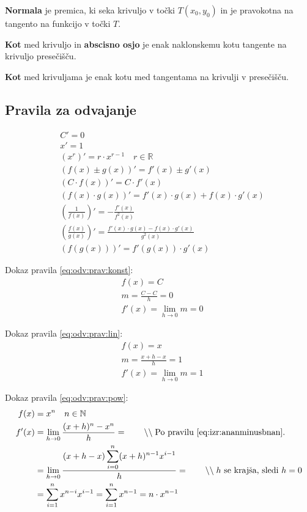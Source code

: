 \documentclass[a4paper,oneside,12pt,fleqn]{article}
\def\R{\ensuremath{\mathbb R}}
\def\N{\ensuremath{\mathbb N}}
\newcommand\krat\cdot
\newcommand{\comment}[1]{\ensuremath{\qquad\backslash\backslash\;}\textnormal{#1}}
\def\limh{\lim_{h\rightarrow0}} %
\numberwithin{equation}{section}
\begin{document}
\textbf{Normala} je premica, ki seka krivuljo v točki $T(x_0, y_0)$ in je pravokotna na tangento na
funkcijo v točki $T$.

\textbf{Kot} med krivuljo in \textbf{abscisno osjo} je enak naklonskemu kotu tangente na krivuljo
presečišču.

\textbf{Kot} med krivuljama je enak kotu med tangentama na krivulji v presečišču.

\subsection{Pravila za odvajanje}
\label{sec:odvod:prav}

\begin{align}
  & C' = 0 \label{eq:odv:prav:konst} \\
  & x' = 1 \label{eq:odv:prav:lin} \\
  & \left( x^r \right)' = r\krat x^{r-1} \quad r \in \R \label{eq:odv:prav:pow} \\
  & (f(x) \pm g(x))' = f'(x) \pm g'(x) \label{eq:odv:prav:sum} \\
  & (C\krat f(x))' = C\krat f'(x) \label{eq:odv:prav:konstkrat} \\
  & (f(x)\krat g(x))' = f'(x)\krat g(x) + f(x)\krat g'(x) \label{eq:odv:prav:krat} \\
  & \left(\frac{1}{f(x)}\right)' = - \frac{f'(x)}{f^2(x)} \label{eq:odv:prav:enaz} \\
  & \left( \frac{f(x)}{g(x)} \right)' = \frac{f'(x)\krat g(x) - f(x)\krat g'(x)}{g^2(x)} \label{eq:odv:prav:del} \\
  & \left( f(g(x)) \right)' = f'(g(x))\krat g'(x) \label{eq:odv:prav:komp}
\end{align}

Dokaz pravila \eqref{eq:odv:prav:konst}:
\begin{align*}
  & f(x) = C \\
  & m = \frac{C - C}{h} = 0 \\
  & f'(x) = \limh  m = 0
\end{align*}

Dokaz pravila \eqref{eq:odv:prav:lin}:
\begin{align*}
  & f(x) = x \\
  & m = \frac{x+h-x}{h} = 1 \\
  & f'(x) = \limh  m = 1
\end{align*}

Dokaz pravila \eqref{eq:odv:prav:pow}:
\begin{align*}
  f(x) &= x^n  \quad n \in \N \\
  f'(x) &= \limh  \frac{(x+h)^n - x^n}{h} = \comment{Po pravilu \eqref{eq:izr:ananminusbnan}.} \\
  &= \limh  \frac{(x+h-x)\displaystyle\sum_{i=0}^n (x+h)^{n-1}x^{i-1}}{h} = \comment{$h$ se krajša, sledi $h = 0$} \\
  &= \sum_{i=1}^nx^{n-i}x^{i-1} = \sum_{i=1}^nx^{n-1} = n\krat x^{n-1}
\end{align*}
\end{document}

